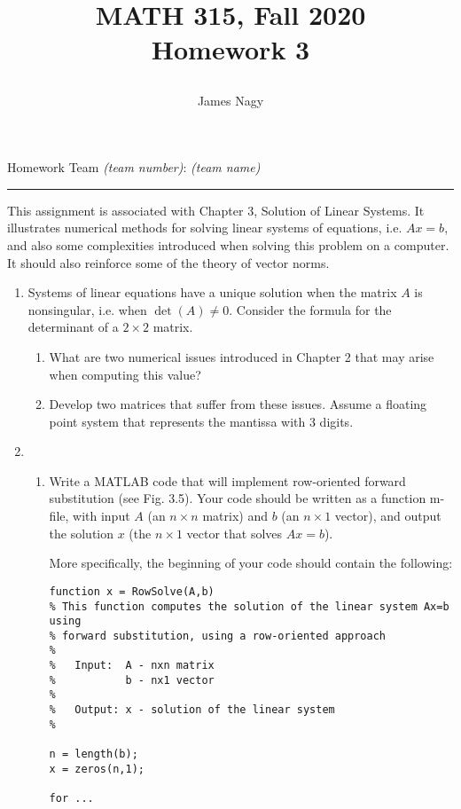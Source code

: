 \documentclass[12pt]{article}
\title{MATH 315, Fall 2020 \\[3pt]
Homework 3
\date{}}
\author{James Nagy}
\begin{document}
\maketitle

\begin{center}
Homework Team \textit{(team number)}: \textit{(team name)} \\
\rule[0pt]{12cm}{1pt}
\end{center}


This assignment is associated with Chapter 3, Solution of Linear Systems. It illustrates numerical methods for solving linear systems of equations, i.e. $A{x}={b}$, and also some complexities introduced when solving this problem on a computer.  It should also reinforce some of the theory of vector norms.
%
\begin{enumerate}
\item Systems of linear equations have a unique solution when the matrix $A$ is nonsingular, i.e. when $\det(A) \ne 0$. Consider the formula for the determinant of a $2\times 2$ matrix.  
\begin{enumerate}
\item What are two numerical issues introduced in Chapter 2 that may arise when computing this value?
\item Develop two matrices that suffer from these issues.  Assume a floating point system that represents the mantissa with 3 digits.
\end{enumerate}

\item 

\begin{enumerate}
\item Write a MATLAB code that will implement row-oriented forward substitution (see Fig. 3.5).  Your code should be written as a function m-file, with input $A$ (an $n \times n$ matrix) and $b$ (an $n \times 1$ vector), and output the solution $x$ (the $n \times 1$ vector that solves $Ax=b$).

More specifically, the beginning of your code should contain the following:
{\footnotesize
\begin{verbatim}
function x = RowSolve(A,b)
% This function computes the solution of the linear system Ax=b using
% forward substitution, using a row-oriented approach
% 
%   Input:  A - nxn matrix
%           b - nx1 vector
% 
%   Output: x - solution of the linear system
% 

n = length(b);
x = zeros(n,1);

for ...


\end{verbatim}}
\end{enumerate}
\end{enumerate}
\end{document}
